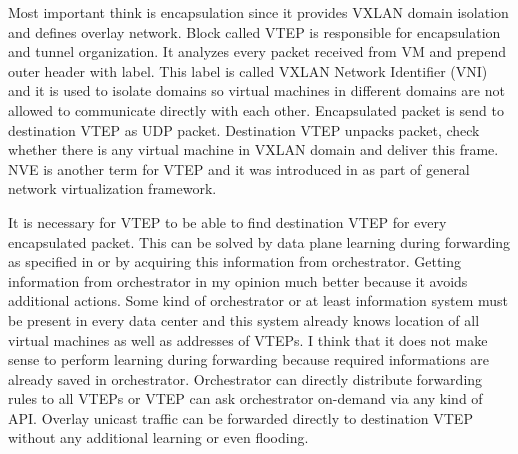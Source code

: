 Most important think is encapsulation since it provides \Ac{VXLAN} domain isolation and defines overlay network. Block called \Ac{VTEP} is responsible for encapsulation and tunnel organization. It analyzes every packet received from \Ac{VM} and prepend outer header with label. This label is called \Ac{VXLAN} Network Identifier (\Ac{VNI}) and it is used to isolate domains so virtual machines in different domains are not allowed to communicate directly with each other. Encapsulated packet is send to destination \Ac{VTEP} as \Ac{UDP} packet. Destination \Ac{VTEP} unpacks packet, check whether there is any virtual machine in \Ac{VXLAN} domain and deliver this frame. \Ac{NVE} is another term for \Ac{VTEP} and it was introduced in \cite{7365} as part of general network virtualization framework.

It is necessary for \Ac{VTEP} to be able to find destination \Ac{VTEP} for every encapsulated packet. This can be solved by data plane learning during forwarding as specified in \cite{rfc7348} or by acquiring this information from orchestrator. Getting information from orchestrator in my opinion much better because it avoids additional actions. Some kind of orchestrator or at least information system must be present in every data center and this system already knows location of all virtual machines as well as addresses of \Ac{VTEP}s. I think that it does not make sense to perform learning during forwarding because required informations are already saved in orchestrator. Orchestrator can directly distribute forwarding rules to all \Ac{VTEP}s or \Ac{VTEP} can ask orchestrator on-demand via any kind of \Ac{API}. Overlay unicast traffic can be forwarded directly to destination \Ac{VTEP} without any additional learning or even flooding.

